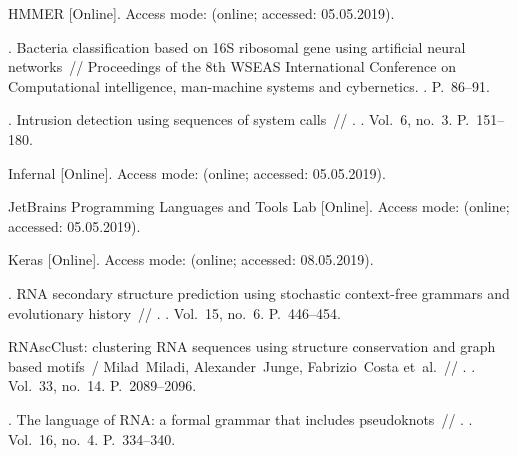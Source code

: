 \begin{thebibliography}{10}
HMMER [Online]. \BibDash
\newblock Access mode:  (online; accessed:
  05.05.2019).

. Bacteria
  classification based on 16S ribosomal gene using artificial neural
  networks~// Proceedings of the 8th WSEAS International Conference on
  Computational intelligence, man-machine systems and cybernetics. \BibDash
{}. \BibDash
\newblock P.~86--91.

. Intrusion
  detection using sequences of system calls~// . \BibDash
{}. \BibDash
\newblock Vol.~6, no.~3. \BibDash
\newblock P.~151--180.

Infernal [Online]. \BibDash
\newblock Access mode:  (online; accessed:
  05.05.2019).

JetBrains Programming Languages and Tools Lab [Online]. \BibDash
\newblock Access mode: 
  (online; accessed: 05.05.2019).

Keras [Online]. \BibDash
\newblock Access mode:  (online; accessed:
  08.05.2019).

. RNA secondary structure prediction using
  stochastic context-free grammars and evolutionary history~//
  . \BibDash
{}. \BibDash
\newblock Vol.~15, no.~6. \BibDash
\newblock P.~446--454.

RNAscClust: clustering RNA sequences using structure conservation and graph
  based motifs~/ Milad~Miladi, Alexander~Junge, Fabrizio~Costa et~al.~//
  . \BibDash
{}. \BibDash
\newblock Vol.~33, no.~14. \BibDash
\newblock P.~2089--2096.

. The language of RNA: a formal grammar that
  includes pseudoknots~// . \BibDash
{}. \BibDash
\newblock Vol.~16, no.~4. \BibDash
\newblock P.~334--340.


\end{thebibliography}
